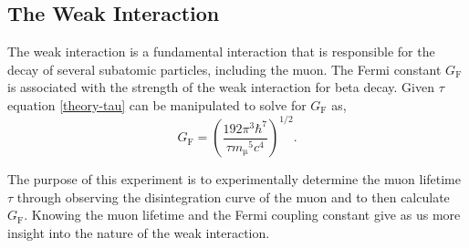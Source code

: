 \documentclass[%
 reprint,
 amsmath,amssymb,
 aps,
]{revtex4-2}
\begin{document}
\subsection{The Weak Interaction}
The weak interaction is a fundamental interaction that is responsible for the decay of several subatomic particles, including the muon. The Fermi constant $G_\mathrm{F}$ is associated with the strength of the weak interaction for beta decay. Given $\tau$ equation \ref{theory-tau} can be manipulated to solve for $G_\mathrm{F}$ as,
\begin{equation}
	{G_\mathrm{F}} = \left(\frac{192\pi^3\hbar^7}{\tau {m_\mathrm{\mu}}^5 c^4}\right)^{1/2}.
	\label{gf-eq}
\end{equation}

\par
The purpose of this experiment is to experimentally determine the muon lifetime $\tau$ through observing the disintegration curve of the muon and to then calculate $G_\mathrm{F}$. Knowing the muon lifetime and the Fermi coupling constant give as us more insight into the nature of the weak interaction.
\end{document}
